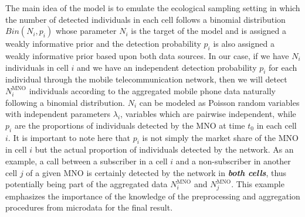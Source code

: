 \documentclass[12pt, a4paper]{article}
\begin{document}
The main idea of the model is to emulate the ecological sampling setting in which 
the number of detected individuals in each cell follows a binomial distribution $Bin(N_{i}, p_{i})$ 
whose parameter $N_{i}$ is the target of the model and is assigned a weakly informative prior 
and the detection probability $p_{i}$ is also assigned a weakly informative prior based 
upon both data sources. In our case, if we have $N_{i}$ individuals in cell $i$ and 
we have an independent detection probability $p_{i}$ for each individual through 
the mobile telecommunication network, then we will detect $N_{i}^{\textrm{MNO}}$ 
individuals according to the aggregated mobile phone data naturally following a binomial 
distribution. $N_{i}$  can be modeled as Poisson random variables with independent 
parameters $\lambda_{i}$, variables which are pairwise independent, while $p_{i}$ are 
the proportions of individuals detected by the MNO at time $t_{0}$ in each cell $i$. 
It is important to note here that $p_{i}$ is not simply the market share of the MNO in 
cell $i$ but the actual proportion of individuals detected by the network. As an 
example, a call between a subscriber in a cell $i$ and a non-subscriber in another 
cell $j$ of a given MNO is certainly detected by the network in \emph{\textbf{both cells}}, 
thus potentially being part of the aggregated data $N_{i}^{\textrm{MNO}}$ and $N_{j}^{\textrm{MNO}}$. 
This example emphasizes the importance  of the knowledge of the preprocessing and aggregation 
procedures from microdata for the final result.
\end{document}
